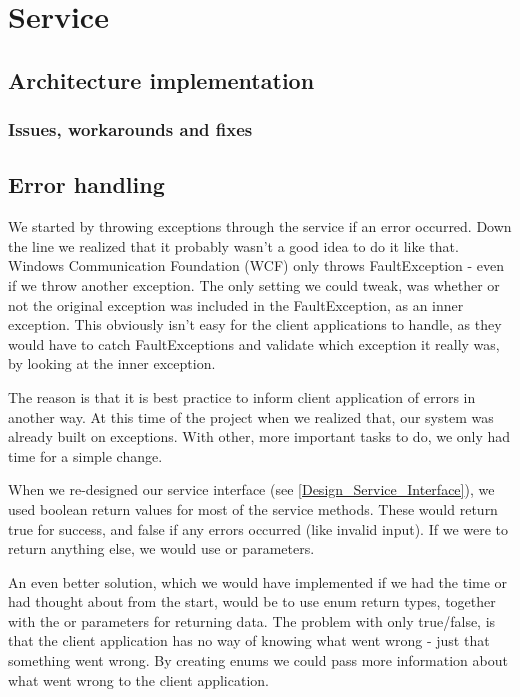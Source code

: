 \section{Service}
\label{Implementation_Service}

\subsection[Architecture]{Architecture implementation}
\label{Implementation_Service_Architecture}

\subsubsection{Issues, workarounds and fixes}
\label{Implementation_Service_Architecture_Issues}

\subsection{Error handling}
\label{Implementation_Service_Error}

We started by throwing exceptions through the service if an error occurred. Down the line we realized that it probably wasn't a good idea to do it like that. Windows Communication Foundation (WCF) only throws FaultException - even if we throw another exception. The only setting we could tweak, was whether or not the original exception was included in the FaultException, as an inner exception. This obviously isn't easy for the client applications to handle, as they would have to catch FaultExceptions and validate which exception it really was, by looking at the inner exception.

The reason is that it is best practice to inform client application of errors in another way. At this time of the project when we realized that, our system was already built on exceptions. With other, more important tasks to do, we only had time for a simple change.

When we re-designed our service interface (see \ref{Design_Service_Interface}), we used boolean return values for most of the service methods. These would return true for success, and false if any errors occurred (like invalid input). If we were to return anything else, we would use  or  parameters.

An even better solution, which we would have implemented if we had the time or had thought about from the start, would be to use enum return types, together with the  or  parameters for returning data. The problem with only true/false, is that the client application has no way of knowing what went wrong - just that something went wrong. By creating enums we could pass more information about what went wrong to the client application.

